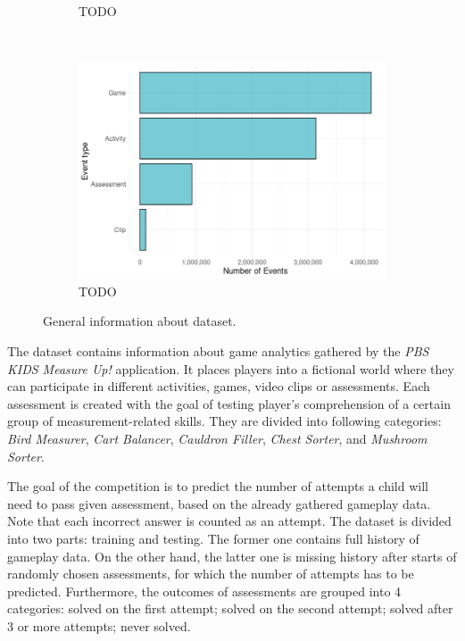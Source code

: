 \documentclass[fleqn,10pt]{SelfArx} %
\begin{document}
\begin{figure}
\begin{subfigure}[t]{0.31\textwidth}
        \caption{TODO}
    \end{subfigure}
    ~
    \begin{subfigure}[t]{0.31\textwidth}
        \centering
        \includegraphics[width=\linewidth]{images/event-type-count.png}
        \caption{TODO}
    \end{subfigure}
    \caption{General information about dataset.}
    \label{fig:general-info}
\end{figure}

The dataset contains information about game analytics gathered by the \textit{PBS KIDS Measure Up!} application.
It places players into a fictional world where they can participate in different activities, games, video clips or assessments.
Each assessment is created with the goal of testing player's comprehension of a certain group of measurement-related skills.
They are divided into following categories: \textit{Bird Measurer}, \textit{Cart Balancer}, \textit{Cauldron Filler}, \textit{Chest Sorter}, and \textit{Mushroom Sorter}.

The goal of the competition is to predict the number of attempts a child will need to pass given assessment, based on the already gathered gameplay data.
Note that each incorrect answer is counted as an attempt.
The dataset is divided into two parts: training and testing.
The former one contains full history of gameplay data.
On the other hand, the latter one is missing history after starts of randomly chosen assessments, for which the number of attempts has to be predicted.
Furthermore, the outcomes of assessments are grouped into 4 categories: solved on the first attempt; solved on the second attempt; solved after 3 or more attempts; never solved.
\end{document}
